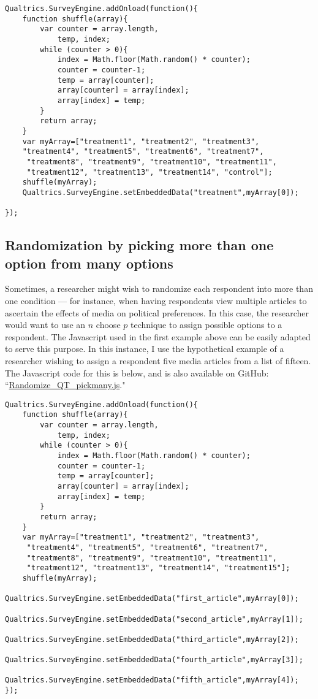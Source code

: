 \documentclass[12pt]{article}
\begin{document}
\begin{verbatim}
Qualtrics.SurveyEngine.addOnload(function(){
	function shuffle(array){
		var counter = array.length,
			temp, index;
		while (counter > 0){
			index = Math.floor(Math.random() * counter);
			counter = counter-1;
			temp = array[counter];
			array[counter] = array[index];
			array[index] = temp;
		}
		return array;
	}
	var myArray=["treatment1", "treatment2", "treatment3", 
	"treatment4", "treatment5", "treatment6", "treatment7",
	 "treatment8", "treatment9", "treatment10", "treatment11", 
	 "treatment12", "treatment13", "treatment14", "control"];
	shuffle(myArray);
	Qualtrics.SurveyEngine.setEmbeddedData("treatment",myArray[0]);

});
\end{verbatim}

\subsection{Randomization by picking more than one option from many options}
Sometimes, a researcher might wish to randomize each respondent into more than one condition --- for instance, when having respondents view multiple articles to ascertain the effects of media on political preferences. In this case, the researcher would want to use an $n$ choose $p$ technique to assign possible options to a respondent. The Javascript used in the first example above can be easily adapted to serve this purpose. In this instance, I use the hypothetical example of a researcher wishing to assign a respondent five media articles from a list of fifteen. The Javascript code for this is below, and is also available on GitHub: ``\href{https://github.com/justindbk/qualtrics-javascript}{Randomize\_QT\_pickmany.js}."

\begin{verbatim}
Qualtrics.SurveyEngine.addOnload(function(){
	function shuffle(array){
		var counter = array.length,
			temp, index;
		while (counter > 0){
			index = Math.floor(Math.random() * counter);
			counter = counter-1;
			temp = array[counter];
			array[counter] = array[index];
			array[index] = temp;
		}
		return array;
	}
	var myArray=["treatment1", "treatment2", "treatment3",
	 "treatment4", "treatment5", "treatment6", "treatment7", 
	 "treatment8", "treatment9", "treatment10", "treatment11", 
	 "treatment12", "treatment13", "treatment14", "treatment15"];
	shuffle(myArray);
	Qualtrics.SurveyEngine.setEmbeddedData("first_article",myArray[0]);
	Qualtrics.SurveyEngine.setEmbeddedData("second_article",myArray[1]);
	Qualtrics.SurveyEngine.setEmbeddedData("third_article",myArray[2]);
	Qualtrics.SurveyEngine.setEmbeddedData("fourth_article",myArray[3]);
	Qualtrics.SurveyEngine.setEmbeddedData("fifth_article",myArray[4]);
});
\end{verbatim}
\end{document}
